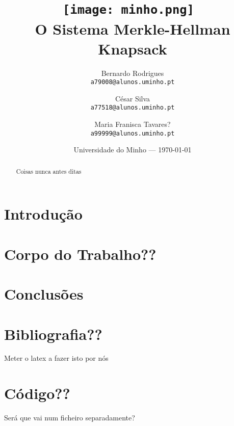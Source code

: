 \documentclass[11pt]{report}
\begin{document}
\title{\texttt{[image: minho.png]}~\\[1cm] O Sistema Merkle-Hellman Knapsack}

\author{Bernardo Rodrigues\\ \texttt{a79008@alunos.uminho.pt}\\ \and César Silva\\ \texttt{a77518@alunos.uminho.pt}\\ \and Maria Franisca Tavares?\\ \texttt{a99999@alunos.uminho.pt}\\}

\date{Universidade do Minho --- \today}

\maketitle

\tableofcontents

\begin{abstract}

	Coisas nunca antes ditas

\end{abstract}

\chapter{Introdução}

\chapter{Corpo do Trabalho??}

\chapter{Conclusões}

\chapter{Bibliografia??}

Meter o latex a fazer isto por nós

\appendix

\chapter{Código??}

Será que vai num ficheiro separadamente?
\end{document}
